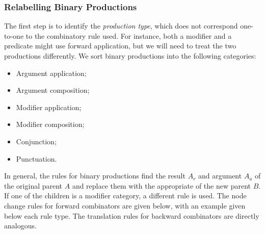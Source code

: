 \subsubsection{Relabelling Binary Productions}
\label{sec:relabel_rule}
The first step is to identify the  \emph{production type}, which does not
correspond one-to-one to the combinatory rule used. For instance, both a
modifier and a predicate might use forward application, but we will need to treat
the two productions differently. We sort binary productions into the following
categories:
\begin{itemize}
\item Argument application;
\item Argument composition;
\item Modifier application;
\item Modifier composition;
\item Conjunction;
\item Punctuation.
\end{itemize}

In general, the rules for binary productions find the result $A_r$ and argument
$A_a$ of the original parent $A$ and replace them with the appropriate of the
new parent $B$. If one of the children is a modifier category, a different rule
is used. The node change rules for forward combinators are given below, with an
example given below each rule type. The translation rules for backward
combinators are directly analogous.

